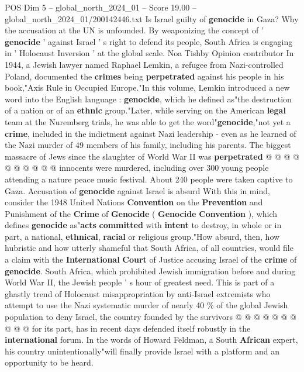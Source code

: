 \begin{textsample}{POS Dim 5 – global\_north\_2024\_01 – Score 19.00 – global\_north\_2024\_01/200142446.txt}  \label{ex:f5_pos_137}
Is Israel guilty of \textbf{genocide} in Gaza?
Why the accusation at the UN is unfounded.
By weaponizing the concept of ' \textbf{genocide} ' against Israel ' s right to defend its people, South Africa is engaging in ' Holocaust Inversion ' at the global scale.
Noa Tishby Opinion contributor In 1944, a Jewish lawyer named Raphael Lemkin, a refugee from Nazi-controlled Poland, documented the \textbf{crimes} being \textbf{perpetrated} against his people in his book,"Axis Rule in Occupied Europe."In this volume, Lemkin introduced a new word into the English language : \textbf{genocide}, which he defined as"the destruction of a nation or of an \textbf{ethnic} group."Later, while serving on the American \textbf{legal} team at the Nuremberg trials, he was able to get the word"\textbf{genocide},"not yet a \textbf{crime}, included in the indictment against Nazi leadership - even as he learned of the Nazi murder of 49 members of his family, including his parents.
The biggest massacre of Jews since the slaughter of World War II was \textbf{perpetrated} @ @ @ @ @ @ @ @ @ @ innocents were murdered, including over 300 young people attending a nature peace music festival.
About 240 people were taken captive to Gaza.
Accusation of \textbf{genocide} against Israel is absurd With this in mind, consider the 1948 United Nations \textbf{Convention} on the \textbf{Prevention} and Punishment of the \textbf{Crime} of \textbf{Genocide} ( \textbf{Genocide} \textbf{Convention} ), which defines \textbf{genocide} as"\textbf{acts} \textbf{committed} with \textbf{intent} to destroy, in whole or in part, a national, \textbf{ethnical}, \textbf{racial} or religious group."How absurd, then, how hubristic and how utterly shameful that South Africa, of all countries, would file a claim with the \textbf{International} \textbf{Court} of Justice accusing Israel of the \textbf{crime} of \textbf{genocide}.
South Africa, which prohibited Jewish immigration before and during World War II, the Jewish people ' s hour of greatest need.
This is part of a ghastly trend of Holocaust misappropriation by anti-Israel extremists who attempt to use the Nazi systematic murder of nearly 40 \% of the global Jewish population to deny Israel, the country founded by the survivors @ @ @ @ @ @ @ @ @ @ for its part, has in recent days defended itself robustly in the \textbf{international} forum.
In the words of Howard Feldman, a South \textbf{African} expert, his country unintentionally"will finally provide Israel with a platform and an opportunity to be heard.

\end{textsample}
